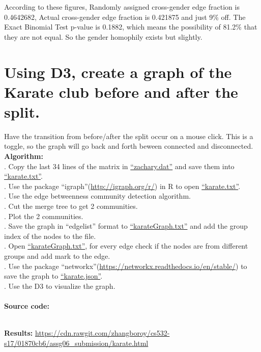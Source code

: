 \documentclass{article}
\begin{document}
		According to these figures, Randomly assigned cross-gender edge fraction is 0.4642682, Actual cross-gender edge fraction is 0.421875 and just 9\% off. The Exact Binomial Test p-value is 0.1882, which means the possibility of 81.2\% that they are not equal. So the gender homophily exists but slightly.\\
		\section{Using D3, create a graph of the Karate club before and after the split.}
		\indent Have the transition from before/after the split occur on a mouse click. This is a toggle, so the graph will go back and forth beween connected and disconnected.\\

		\textbf{Algorithm:}\\
		. Copy the last 34 lines of the matrix in \href{https://github.com/zhangboroy/cs532-s17/blob/master/assg06_submission/zachary.dat}{``zachary.dat''} and save them into \href{https://github.com/zhangboroy/cs532-s17/blob/master/assg06_submission/karate.txt}{``karate.txt''}.\\
		. Use the package ``igraph''(\url{http://igraph.org/r/}) in R to open \href{https://github.com/zhangboroy/cs532-s17/blob/master/assg06_submission/karate.txt}{``karate.txt''}.\\
		. Use the edge betweenness community detection algorithm.\\
		. Cut the merge tree to get 2 communities.\\
		. Plot the 2 communities.\\
		. Save the graph in ``edgelist'' format to \href{https://github.com/zhangboroy/cs532-s17/blob/master/assg06_submission/karateGraph.txt}{``karateGraph.txt''} and add the group index of the nodes to the file.\\
		. Open \href{https://github.com/zhangboroy/cs532-s17/blob/master/assg06_submission/karateGraph.txt}{``karateGraph.txt''}, for every edge check if the nodes are from different groups and add mark to the edge.\\
		. Use the package ``networkx''(\url{https://networkx.readthedocs.io/en/stable/}) to save the graph to \href{https://github.com/zhangboroy/cs532-s17/blob/master/assg06_submission/karate.json}{``karate.json''}.\\
		. Use the D3 to visualize the graph.\\\\
		\textbf{Source code:}
		
		
		

		\noindent\\\textbf{Results: }\url{https://cdn.rawgit.com/zhangboroy/cs532-s17/01870cb6/assg06_submission/karate.html}
	
\end{document}
